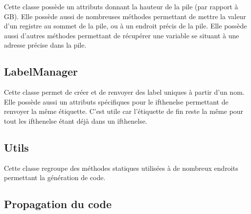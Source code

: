 \documentclass[12pt, a4paper, one side]{article}
\begin{document}
Cette classe possède un attributs donnant la hauteur de la pile (par rapport à GB). Elle possède aussi
de nombreuses méthodes permettant de mettre la valeur d'un registre au sommet de la pile, ou à un
endroit précis de la pile. Elle possède aussi d'autres méthodes permettant de récupérer une variable
se situant à une adresse précise dans la pile.

\subsection{LabelManager}

Cette classe permet de créer et de renvoyer des label uniques à partir d'un nom. Elle possède aussi
un attributs spécifiques pour le ifthenelse permettant de renvoyer la même étiquette. C'est utile car
l'étiquette de fin reste la même pour tout les ifthenelse étant déjà dans un ifthenelse.

\subsection{Utils}

Cette classe regroupe des méthodes statiques utilisées à de nombreux endroits permettant la génération
de code.

\subsection{Propagation du code}
\end{document}
